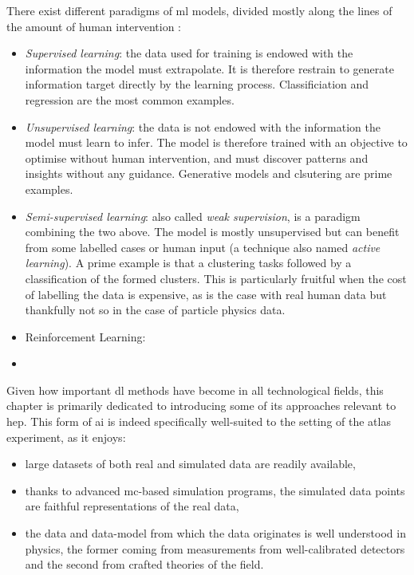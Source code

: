 There exist different paradigms of \gls{ml} models, divided mostly along the lines of the amount of human intervention \cite{Murphy_ML}:
\begin{itemize}
    \item \textit{Supervised learning}: the data used for training is endowed with the information the model must extrapolate. It is therefore restrain to generate information target directly by the learning process. Classificiation and regression are the most common examples.
    \item \textit{Unsupervised learning}: the data is not endowed with the information the model must learn to infer. The model is therefore trained with an objective to optimise without human intervention, and must discover patterns and insights without any guidance. Generative models and clsutering are prime examples.
    \item \textit{Semi-supervised learning}: also called \textit{weak supervision}, is a paradigm combining the two above. The model is mostly unsupervised but can benefit from some labelled cases or human input (a technique also named \textit{active learning}). A prime example is that a clustering tasks followed by a classification of the formed clusters. This is particularly fruitful when the cost of labelling the data is expensive, as is the case with real human data but thankfully not so in the case of particle physics data.
    \item Reinforcement Learning:
    \item 
\end{itemize}

Given how important \gls{dl} methods have become in all technological fields, this chapter is primarily dedicated to introducing some of its approaches relevant to \gls{hep}. This form of \gls{ai} is indeed specifically well-suited to the setting of the \gls{atlas} experiment, as it enjoys:
\begin{itemize}
    \item large datasets of both real and simulated data are readily available,
    \item thanks to advanced \gls{mc}-based simulation programs, the simulated data points are faithful representations of the real data,
    \item the data and data-model from which the data originates is well understood in physics, the former coming from measurements from well-calibrated detectors and the second from crafted theories of the field. 
\end{itemize}


